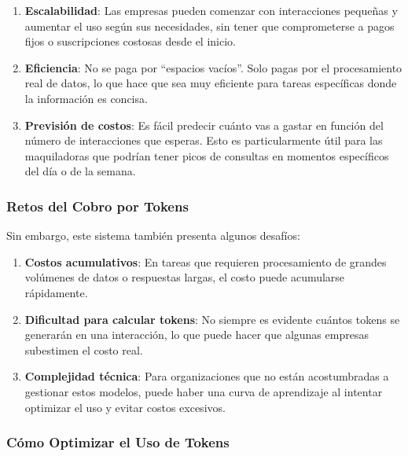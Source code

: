 \documentclass[
  10pt,
  letterpaper,
]{book}
\providecommand{\tightlist}{%
  \setlength{\itemsep}{0pt}\setlength{\parskip}{0pt}}\usepackage{longtable,booktabs,array}
\begin{document}
\begin{enumerate}
\def\labelenumi{\arabic{enumi}.}
\tightlist
\item
  \textbf{Escalabilidad}: Las empresas pueden comenzar con interacciones
  pequeñas y aumentar el uso según sus necesidades, sin tener que
  comprometerse a pagos fijos o suscripciones costosas desde el inicio.
\item
  \textbf{Eficiencia}: No se paga por ``espacios vacíos''. Solo pagas
  por el procesamiento real de datos, lo que hace que sea muy eficiente
  para tareas específicas donde la información es concisa.
\item
  \textbf{Previsión de costos}: Es fácil predecir cuánto vas a gastar en
  función del número de interacciones que esperas. Esto es
  particularmente útil para las maquiladoras que podrían tener picos de
  consultas en momentos específicos del día o de la semana.
\end{enumerate}

\subsubsection{\texorpdfstring{\textbf{Retos del Cobro por
Tokens}}{Retos del Cobro por Tokens}}\label{retos-del-cobro-por-tokens}

Sin embargo, este sistema también presenta algunos desafíos:

\begin{enumerate}
\def\labelenumi{\arabic{enumi}.}
\tightlist
\item
  \textbf{Costos acumulativos}: En tareas que requieren procesamiento de
  grandes volúmenes de datos o respuestas largas, el costo puede
  acumularse rápidamente.
\item
  \textbf{Dificultad para calcular tokens}: No siempre es evidente
  cuántos tokens se generarán en una interacción, lo que puede hacer que
  algunas empresas subestimen el costo real.
\item
  \textbf{Complejidad técnica}: Para organizaciones que no están
  acostumbradas a gestionar estos modelos, puede haber una curva de
  aprendizaje al intentar optimizar el uso y evitar costos excesivos.
\end{enumerate}

\subsubsection{\texorpdfstring{\textbf{Cómo Optimizar el Uso de
Tokens}}{Cómo Optimizar el Uso de Tokens}}\label{cuxf3mo-optimizar-el-uso-de-tokens}
\end{document}
